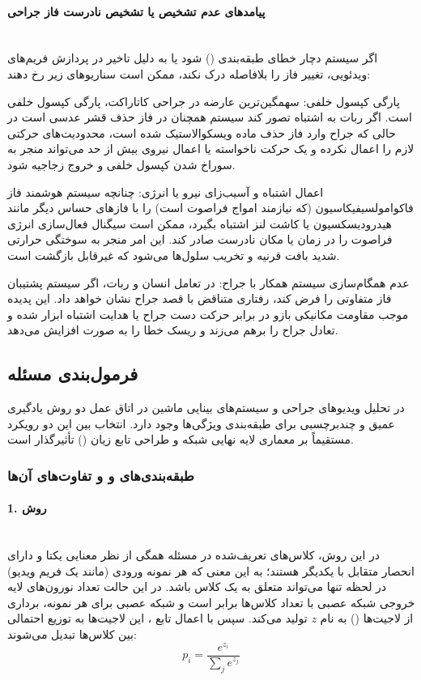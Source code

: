 \documentclass{article}
\begin{document}
\paragraph{پیامدهای عدم تشخیص یا تشخیص نادرست فاز جراحی} \mbox{}\\
اگر سیستم دچار خطای طبقه‌بندی () شود یا به دلیل تاخیر در پردازش فریم‌های ویدئویی، تغییر فاز را بلافاصله درک نکند، ممکن است سناریوهای زیر رخ دهند:
\begin{description}
\item پارگی کپسول خلفی:
سهمگین‌ترین عارضه در جراحی کاتاراکت، پارگی کپسول خلفی است. اگر ربات به اشتباه تصور کند سیستم همچنان در فاز حذف قشر عدسی است در حالی که جراح وارد فاز حذف ماده ویسکوالاستیک شده است، محدودیت‌های حرکتی لازم را اعمال نکرده و یک حرکت ناخواسته یا اعمال نیروی بیش از حد می‌تواند منجر به سوراخ شدن کپسول خلفی و خروج زجاجیه شود.
\item اعمال اشتباه و آسیب‌زای نیرو یا انرژی:
چنانچه سیستم هوشمند فاز فاکوامولسیفیکاسیون (که نیازمند امواج فراصوت است) را با فازهای حساس دیگر مانند هیدرودیسکسیون یا کاشت لنز اشتباه بگیرد، ممکن است سیگنال فعال‌سازی انرژی فراصوت را در زمان یا مکان نادرست صادر کند. این امر منجر به سوختگی حرارتی شدید بافت قرنیه و تخریب سلول‌ها می‌شود که غیرقابل بازگشت است.
\item عدم همگام‌سازی سیستم همکار با جراح:
در تعامل انسان و ربات، اگر سیستم پشتیبان فاز متفاوتی را فرض کند، رفتاری متناقض با قصد جراح نشان خواهد داد. این پدیده موجب مقاومت مکانیکی بازو در برابر حرکت دست جراح یا هدایت اشتباه ابزار شده و تعادل جراح را برهم می‌زند و ریسک خطا را به صورت افزایش می‌دهد.
\end{description}

\subsection{فرمول‌بندی مسئله}
در تحلیل ویدیوهای جراحی و سیستم‌های بینایی ماشین در اتاق عمل دو روش‌ یادگیری عمیق  و چندبرچسبی  برای طبقه‌بندی ویژگی‌ها وجود دارد. انتخاب بین این دو رویکرد مستقیماً بر معماری لایه نهایی شبکه و طراحی تابع زیان () تأثیرگذار است.
\subsubsection{طبقه‌بندی‌های  و  و تفاوت‌های آن‌ها}

\paragraph{1. روش }\mbox{}\\
در این روش، کلاس‌های تعریف‌شده در مسئله همگی از نظر معنایی یکتا و دارای انحصار متقابل با یکدیگر هستند؛ به این معنی که هر نمونه ورودی (مانند یک فریم ویدیو) در لحظه تنها می‌تواند متعلق به یک کلاس باشد. در این حالت تعداد نورون‌های لایه خروجی شبکه عصبی با تعداد کلاس‌ها برابر است و  شبکه عصبی برای هر نمونه، برداری از لاجیت‌ها () به نام $z$ تولید می‌کند. سپس با اعمال تابع ، این لاجیت‌ها به توزیع احتمالی بین کلاس‌ها تبدیل می‌شوند:
\[ 
p_i = \frac{e^{z_i}}{\sum_j e^{z_j}}
\]
\end{document}
